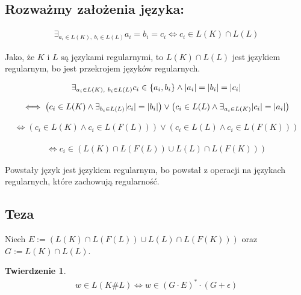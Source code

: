 \documentclass{article}
\newtheorem{theorem}{Twierdzenie}[section]
\theoremstyle{definition}
\theoremstyle{remark}
\begin{document}
\subsection{Rozważmy założenia języka:}

\begin{align*}
    \exists_{ a_i \in L(K), \ b_i \in L(L)} { a_i = b_i = c_i }\iff c_i \in L(K) \cap L(L)
\end{align*}

Jako, że \(K\) i \(L\) są językami regularnymi, to \(L(K) \cap L(L)\) jest językiem regularnym, bo jest przekrojem języków regularnych.


\begin{align*}
\exists_{ a_i \in L(K), \ b_i \in L(L)} { c_i \in \left\{ a_i, b_i \right\} \land \abs{a_i}=\abs{b_i}=\abs{c_i} }
\end{align*}

\begin{align*}
\iff
\left( c_i \in L(K) \land \exists_{ b_i \in L(L) }{ \abs{c_i} = \abs{b_i} } \right) \lor \left( c_i \in L(L) \land \exists_{ a_i \in L(K) }{ \abs{c_i} = \abs{a_i} } \right)
\end{align*}

\begin{align*}
    \iff
    \left( c_i \in L(K) \land c_i \in L(F(L)) \right) \lor \left( c_i \in L(L) \land c_i \in L(F(K)) \right)
\end{align*}

\begin{align*}
    \iff
    c_i \in \left( L(K) \cap L(F(L)) \cup L(L) \cap L(F(K)) \right)
\end{align*}

Powstały język jest językiem regularnym, bo powstał z operacji na językach regularnych, które zachowują regularność.

\subsection{Teza}

Niech \( E := \left( L(K) \cap L(F(L)) \cup L(L) \cap L(F(K)) \right) \) oraz \( G := L(K) \cap L(L) \).

\begin{theorem}
    \begin{align*}
        w \in L(K \# L) \iff w \in \left( G \cdot E \right)^* \cdot \left( G + \epsilon \right)
    \end{align*}
\end{theorem}
\end{document}
